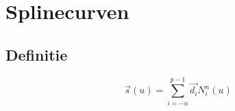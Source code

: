 \documentclass[tmi_notities.tex]{subfiles}
\begin{document}
\chapter{Splinecurven}
\section{Definitie}
\[
\vec{s}(u) = \sum_{i=-n}^{p-1}\vec{d_i}N_{i}^{n}(u)
\]
\end{document}
